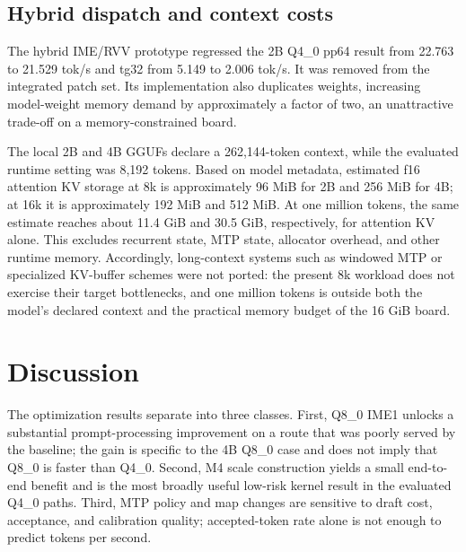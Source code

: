 \documentclass[10pt,twocolumn]{article}
\begin{document}
\begin{table}[t]
\centering
\caption{Aggregate decode throughput (tok/s) on the integrated build (d2t mapped head + M4 scale), 2B.}
\label{tab:conc2}
\end{table}

\subsection{Hybrid dispatch and context costs}
The hybrid IME/RVV prototype regressed the 2B Q4\_0 pp64 result from 22.763 to 21.529 tok/s and tg32 from 5.149 to 2.006 tok/s. It was removed from the integrated patch set. Its implementation also duplicates weights, increasing model-weight memory demand by approximately a factor of two, an unattractive trade-off on a memory-constrained board.

The local 2B and 4B GGUFs declare a 262,144-token context, while the evaluated runtime setting was 8,192 tokens. Based on model metadata, estimated f16 attention KV storage at 8k is approximately 96 MiB for 2B and 256 MiB for 4B; at 16k it is approximately 192 MiB and 512 MiB. At one million tokens, the same estimate reaches about 11.4 GiB and 30.5 GiB, respectively, for attention KV alone. This excludes recurrent state, MTP state, allocator overhead, and other runtime memory. Accordingly, long-context systems such as windowed MTP or specialized KV-buffer schemes were not ported: the present 8k workload does not exercise their target bottlenecks, and one million tokens is outside both the model's declared context and the practical memory budget of the 16 GiB board.

\section{Discussion}
The optimization results separate into three classes. First, Q8\_0 IME1 unlocks a substantial prompt-processing improvement on a route that was poorly served by the baseline; the gain is specific to the 4B Q8\_0 case and does not imply that Q8\_0 is faster than Q4\_0. Second, M4 scale construction yields a small end-to-end benefit and is the most broadly useful low-risk kernel result in the evaluated Q4\_0 paths. Third, MTP policy and map changes are sensitive to draft cost, acceptance, and calibration quality; accepted-token rate alone is not enough to predict tokens per second.
\end{document}
